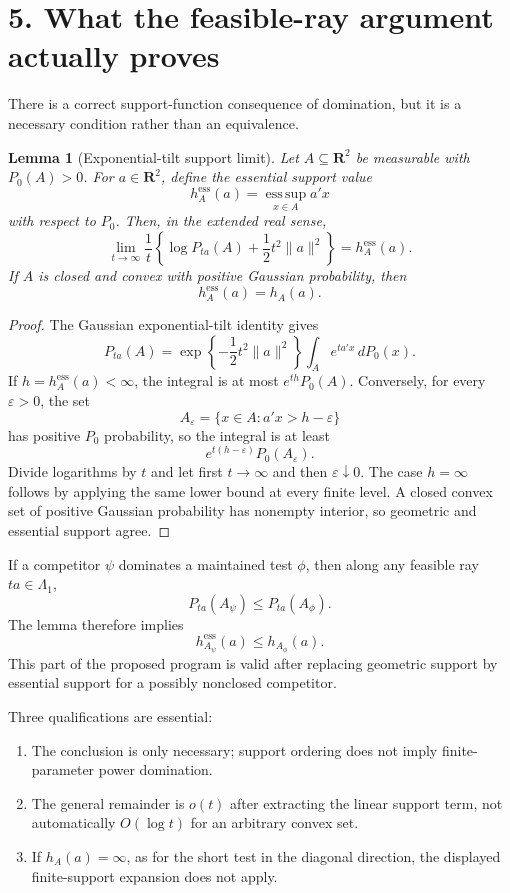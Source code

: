 \documentclass[12pt]{article}
\newtheorem{lemma}{Lemma}
\theoremstyle{definition}
\theoremstyle{remark}
\begin{document}
\section*{5. What the feasible-ray argument actually proves}

There is a correct support-function consequence of domination, but it is a necessary condition rather than an equivalence.

\begin{lemma}[Exponential-tilt support limit]
Let $A\subseteq\mathbf R^2$ be measurable with $P_0(A)>0$.  For $a\in\mathbf R^2$, define the essential support value
\[
h_A^{\mathrm{ess}}(a)
=
\operatorname*{ess\,sup}_{x\in A}a'x
\]
with respect to $P_0$.  Then, in the extended real sense,
\[
\lim_{t\to\infty}
\frac{1}{t}
\left
\{
\log P_{ta}(A)+\frac12t^2\lVert a\rVert^2
\right\}
=
h_A^{\mathrm{ess}}(a).
\]
If $A$ is closed and convex with positive Gaussian probability, then
\[
h_A^{\mathrm{ess}}(a)=h_A(a).
\]
\end{lemma}

\begin{proof}
The Gaussian exponential-tilt identity gives
\[
P_{ta}(A)
=
\exp\left\{-\frac12t^2\lVert a\rVert^2\right\}
\int_A e^{ta'x}\,dP_0(x).
\]
If $h=h_A^{\mathrm{ess}}(a)<\infty$, the integral is at most $e^{th}P_0(A)$.  Conversely, for every $\varepsilon>0$, the set
\[
A_\varepsilon=\{x\in A:a'x>h-\varepsilon\}
\]
has positive $P_0$ probability, so the integral is at least
\[
e^{t(h-\varepsilon)}P_0(A_\varepsilon).
\]
Divide logarithms by $t$ and let first $t\to\infty$ and then $\varepsilon\downarrow0$.  The case $h=\infty$ follows by applying the same lower bound at every finite level.  A closed convex set of positive Gaussian probability has nonempty interior, so geometric and essential support agree.
\end{proof}

If a competitor $\psi$ dominates a maintained test $\phi$, then along any feasible ray $ta\in\Lambda_1$,
\[
P_{ta}(A_\psi)\le P_{ta}(A_\phi).
\]
The lemma therefore implies
\[
h_{A_\psi}^{\mathrm{ess}}(a)
\le
h_{A_\phi}(a).
\]
This part of the proposed program is valid after replacing geometric support by essential support for a possibly nonclosed competitor.

Three qualifications are essential:
\begin{enumerate}[label=(\roman*),leftmargin=2.2em]
\item The conclusion is only necessary; support ordering does not imply finite-parameter power domination.
\item The general remainder is $o(t)$ after extracting the linear support term, not automatically $O(\log t)$ for an arbitrary convex set.
\item If $h_A(a)=\infty$, as for the short test in the diagonal direction, the displayed finite-support expansion does not apply.
\end{enumerate}
\end{document}
